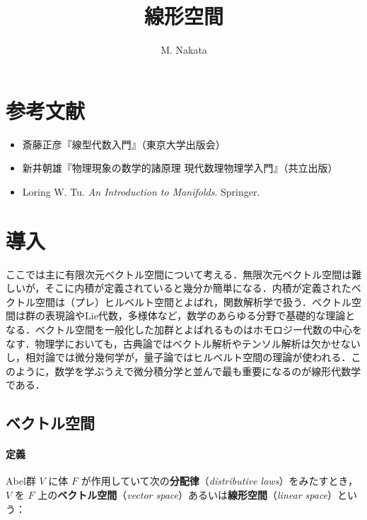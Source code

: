 \documentclass[10pt,b5paper,pandoc]{bxjsarticle}
\title{線形空間}
\author{M. Nakata}
\date{}
\providecommand{\tightlist}{%
  \setlength{\itemsep}{0pt}\setlength{\parskip}{0pt}}
\let\oldparagraph\paragraph
\renewcommand{\paragraph}[1]{\oldparagraph{#1}\mbox{}}
\begin{document}
\maketitle

{
\setcounter{tocdepth}{3}
\tableofcontents
}
\hypertarget{ux53c2ux8003ux6587ux732e}{%
\section{参考文献}\label{ux53c2ux8003ux6587ux732e}}

\begin{itemize}
\tightlist
\item
  斎藤正彦『線型代数入門』（東京大学出版会）
\item
  新井朝雄『物理現象の数学的諸原理 現代数理物理学入門』（共立出版）
\item
  Loring W. Tu. \emph{An Introduction to Manifolds}. Springer.
\end{itemize}

\hypertarget{linear-algebra-introduction}{%
\section{導入}\label{linear-algebra-introduction}}

ここでは主に有限次元ベクトル空間について考える．無限次元ベクトル空間は難しいが，そこに内積が定義されていると幾分か簡単になる．内積が定義されたベクトル空間は（プレ）ヒルベルト空間とよばれ，関数解析学で扱う．ベクトル空間は群の表現論やLie代数，多様体など，数学のあらゆる分野で基礎的な理論となる．ベクトル空間を一般化した加群とよばれるものはホモロジー代数の中心をなす．物理学においても，古典論ではベクトル解析やテンソル解析は欠かせないし，相対論では微分幾何学が，量子論ではヒルベルト空間の理論が使われる．このように，数学を学ぶうえで微分積分学と並んで最も重要になるのが線形代数学である．

\hypertarget{vector-spaces}{%
\subsection{ベクトル空間}\label{vector-spaces}}

\hypertarget{vector-space-def}{%
\paragraph{定義}\label{vector-space-def}}

Abel群 \(V\) に体 \(F\)
が作用していて次の\textbf{分配律}（\emph{distributive
laws}）をみたすとき，\(V\) を \(F\)
上の\textbf{ベクトル空間}（\emph{vector
space}）あるいは\textbf{線形空間}（\emph{linear space}）という：
\end{document}
